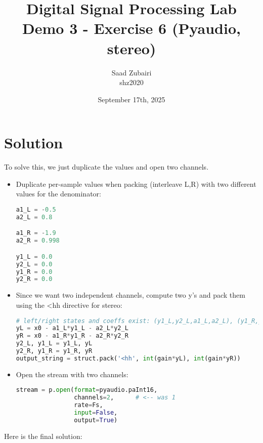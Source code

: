 \documentclass[11pt]{article}
\title{
    \vspace{3em}
    \textbf{Digital Signal Processing Lab}\\
    Demo 3 - Exercise 6 (Pyaudio, stereo)
    \vspace{1em}
}
\author{
    Saad Zubairi \\ 
    shz2020 \\
    \vspace{1em}
}
\date{September 17th, 2025}
\begin{document}
\maketitle	

\pagebreak



\section*{Solution}

To solve this, we just duplicate the values and open two channels.

\begin{itemize}
  \item Duplicate per-sample values when packing (interleave L,R) with two different values for the denominator:
\begin{lstlisting}[language=python]
a1_L = -0.5
a2_L = 0.8

a1_R = -1.9
a2_R = 0.998

y1_L = 0.0
y2_L = 0.0
y1_R = 0.0
y2_R = 0.0
\end{lstlisting}

  \item Since we want two independent channels, compute two y's and pack them using the <hh directive for stereo:
\begin{lstlisting}[language=python]
# left/right states and coeffs exist: (y1_L,y2_L,a1_L,a2_L), (y1_R,y2_R,a1_R,a2_R)
yL = x0 - a1_L*y1_L - a2_L*y2_L
yR = x0 - a1_R*y1_R - a2_R*y2_R
y2_L, y1_L = y1_L, yL
y2_R, y1_R = y1_R, yR
output_string = struct.pack('<hh', int(gain*yL), int(gain*yR))
\end{lstlisting}

  \item Open the stream with two channels:
\begin{lstlisting}[language=python]
stream = p.open(format=pyaudio.paInt16,
                channels=2,      # <-- was 1
                rate=Fs,
                input=False,
                output=True)
\end{lstlisting}
\end{itemize}  
    
Here is the final solution:
\end{document}
